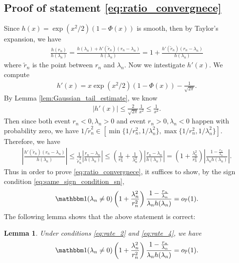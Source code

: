 \documentclass[12pt]{article}
\newtheorem{lemma}{Lemma}
\theoremstyle{definition}
\def\P{\mathbb{P}}
\def\P{\mathbb{P}}
\renewcommand{\P}{\mathbb{P}}							%
\newcommand{\indicator}{\mathbbm 1}						%
\begin{document}
\subsection{Proof of statement \eqref{eq:ratio_convergnece}}

Since $h(x)=\exp(x^2/2)(1-\Phi(x))$ is smooth, then by Taylor's expansion, we have 
\begin{align*}
	\frac{h(r_n)}{h(\lambda_n)}=\frac{h(\lambda_n)+h'(\tilde r_n)(r_n-\lambda_n)}{h(\lambda_n)}=1+\frac{h'(\tilde r_n)(r_n-\lambda_n)}{h(\lambda_n)}
\end{align*}
where $\tilde r_n$ is the point between  $r_n$ and $\lambda_n$. Now we intestigate $h'(x)$. We compute 
\begin{align*}
	h'(x)=x\exp(x^2/2)(1-\Phi(x))-\frac{1}{\sqrt{2\pi}}.
\end{align*}
By Lemma \ref{lem:Gaussian_tail_estimate}, we know 
\begin{align*}
	|h'(x)|\leq \frac{2}{\sqrt{2\pi}}\frac{1}{x^2}\leq \frac{1}{x^2}.
\end{align*}
Then since both event $r_n<0,\lambda_n>0$ and event $r_n>0,\lambda_n<0$ happen with probability zero, we have $1/\tilde r_n^2\in [\min\{1/r_n^2,1/\lambda_n^2\},\max\{1/r_n^2,1/\lambda_n^2\}]$. Therefore, we have 
\begin{align*}
	\left|\frac{h'(\tilde{r}_n)(r_n-\lambda_n)}{h(\lambda_n)}\right|\leq \frac{1}{\tilde{r}_n^2}\left|\frac{r_n-\lambda_n}{h(\lambda_n)}\right|\leq \left(\frac{1}{r_n^2}+\frac{1}{\lambda_n^2}\right)\left|\frac{r_n-\lambda_n}{h(\lambda_n)}\right|=\left(1+\frac{\lambda_n^2}{r_n^2}\right)\left|\frac{1-\frac{r_n}{\lambda_n}}{\lambda_nh(\lambda_n)}\right|.
\end{align*}
Thus in order to prove \eqref{eq:ratio_convergnece}, it suffices to show, by the sign condition \eqref{eq:same_sign_condition_sn},
\begin{align*}
	\indicator(\lambda_n\neq 0)\left(1+\frac{\lambda_n^2}{r_n^2}\right)\frac{1-\frac{r_n}{\lambda_n}}{\lambda_nh(\lambda_n)}=o_{\P}(1).
\end{align*}
The following lemma shows that the above statement is correct:
\begin{lemma}\label{lem:ratio_convergence}
	Under conditions \eqref{eq:rate_2} and \eqref{eq:rate_4}, we have 
	\begin{align*}
		\indicator(\lambda_n\neq 0)\left(1+\frac{\lambda_n^2}{r_n^2}\right)\frac{1-\frac{r_n}{\lambda_n}}{\lambda_nh(\lambda_n)}=o_{\P}(1).
	\end{align*}
\end{lemma}
\end{document}
